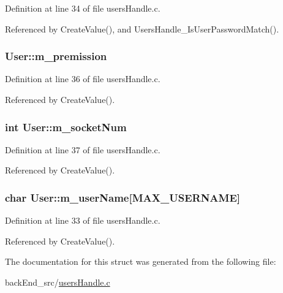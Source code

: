 Definition at line 34 of file users\+Handle.\+c.



Referenced by Create\+Value(), and Users\+Handle\+\_\+\+Is\+User\+Password\+Match().

\subsubsection[{\texorpdfstring{m\+\_\+premission}{m_premission}}]{ User\+::m\+\_\+premission}\hypertarget{structUser_a8026b03d19d534453dfb5359d46a03f0}{}\label{structUser_a8026b03d19d534453dfb5359d46a03f0}


Definition at line 36 of file users\+Handle.\+c.



Referenced by Create\+Value().

\subsubsection[{\texorpdfstring{m\+\_\+socket\+Num}{m_socketNum}}]{\setlength{\rightskip}{0pt plus 5cm}int User\+::m\+\_\+socket\+Num}\hypertarget{structUser_aefd63dee13460eb38eb44e4cef79962b}{}\label{structUser_aefd63dee13460eb38eb44e4cef79962b}


Definition at line 37 of file users\+Handle.\+c.



Referenced by Create\+Value().

\subsubsection[{\texorpdfstring{m\+\_\+user\+Name}{m_userName}}]{\setlength{\rightskip}{0pt plus 5cm}char User\+::m\+\_\+user\+Name\mbox{[}{\bf M\+A\+X\+\_\+\+U\+S\+E\+R\+N\+A\+ME}\mbox{]}}\hypertarget{structUser_a17651ccbee4a3a4c4bb988f01a14bee3}{}\label{structUser_a17651ccbee4a3a4c4bb988f01a14bee3}


Definition at line 33 of file users\+Handle.\+c.



Referenced by Create\+Value().



The documentation for this struct was generated from the following file\+:\begin{DoxyCompactItemize}
\item 
back\+End\+\_\+src/\hyperlink{usersHandle_8c}{users\+Handle.\+c}\end{DoxyCompactItemize}

